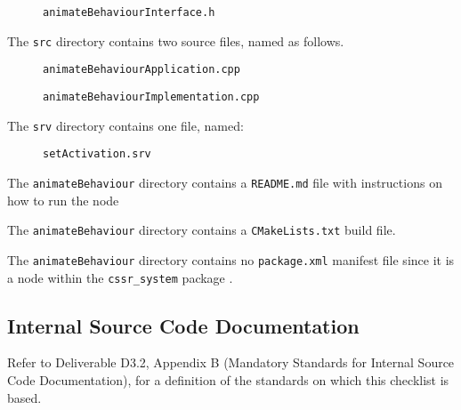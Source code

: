 \documentclass{CSSRforAfrica}
\newcommand{\checkboxChecked}{\fbox{\ding{51}}} %
\begin{document}
\begin{description}
\begin{description}
\item[\checkboxChecked] {\small \verb+animateBehaviourInterface.h+}  
\end{description} 

\item[\checkboxChecked] The  {\small \verb+src+} directory contains two source files, named as follows.
\begin{description}
\item[\checkboxChecked] {\small \verb+animateBehaviourApplication.cpp+}  
\item[\checkboxChecked]  {\small \verb+animateBehaviourImplementation.cpp+}  
\end{description} 

\item[\checkboxChecked] The  {\small \verb+srv+} directory contains one file, named:
\begin{description}
\item[\checkboxChecked] {\small \verb+setActivation.srv+}  
\end{description} 

\item[\checkboxChecked] The {\small \verb+animateBehaviour+} directory contains  a {\small \verb+README.md+} file with  instructions on how to run the node 
\item[\checkboxChecked] The {\small \verb+animateBehaviour+} directory contains  a {\small \verb+CMakeLists.txt+} build file.
\item[\checkboxChecked] The {\small \verb+animateBehaviour+} directory contains  no {\small \verb+package.xml+} manifest file since it is a node within the {\small \verb+cssr_system+} package .

\end{description}


 
 
\subsection{Internal Source Code Documentation}
\label{subsection:animate_behaviour_documentation_standards}  
 
Refer to Deliverable D3.2, Appendix B (Mandatory Standards for Internal Source Code Documentation), for a definition of the standards on which this checklist is based.\\
\end{document}
